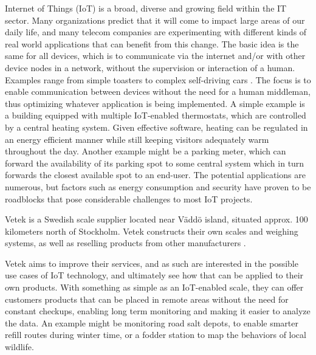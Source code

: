 






Internet of Things (IoT) is a broad, diverse and growing field within the IT sector. Many organizations predict that it will come to impact large areas of our daily life, and many telecom companies are experimenting with different kinds of real world applications that can benefit from this change. The basic idea is the same for all devices, which is to communicate via the internet and/or with other device nodes in a network, without the supervision or interaction of a human. Examples range from simple toasters to complex self-driving cars \cite{what_is_iot}. The focus is to enable communication between devices without the need for a human middleman, thus optimizing whatever application is being implemented. A simple example is a building equipped with multiple IoT-enabled thermostats, which are controlled by a central heating system. Given effective software, heating can be regulated in an energy efficient manner while still keeping visitors adequately warm throughout the day. Another example might be a parking meter, which can forward the availability of its parking spot to some central system which in turn forwards the closest available spot to an end-user. The potential applications are numerous, but factors such as energy consumption and security have proven to be roadblocks that pose considerable challenges to most IoT projects.

Vetek is a Swedish scale supplier located near Väddö island, situated approx. 100 kilometers north of Stockholm. Vetek constructs their own scales and weighing systems, as well as reselling products from other manufacturers \cite{vetek}. 

Vetek aims to improve their services, and as such are interested in the possible use cases of IoT technology, and ultimately see how that can be applied to their own products. With something as simple as an IoT-enabled scale, they can offer customers products that can be placed in remote areas without the need for constant checkups, enabling long term monitoring and making it easier to analyze the data. An example might be monitoring road salt depots, to enable smarter refill routes during winter time, or a fodder station to map the behaviors of local wildlife.

